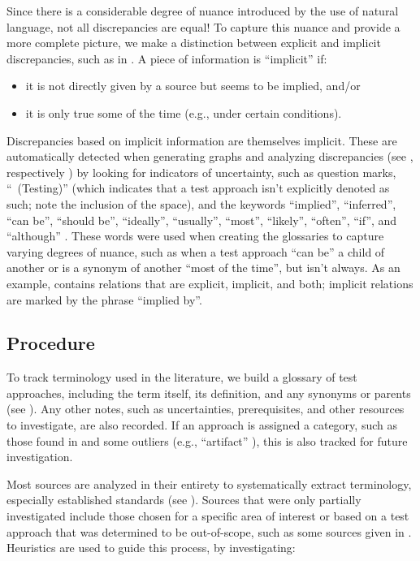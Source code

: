 Since there is a considerable degree of nuance introduced by the use of natural
language, not all discrepancies are equal! To capture this nuance and provide a
more complete picture, we make a distinction between explicit and implicit
discrepancies, such as in . A piece of
information is ``implicit'' if:
\begin{itemize}
    \item it is not directly given by a source but seems to be implied, and/or
    \item it is only true some of the time (e.g., under certain conditions).
\end{itemize}
Discrepancies based on implicit information are themselves implicit. These are
automatically detected when generating graphs and analyzing discrepancies
(see \ifnotpaper {}, respectively\else
    \fi) by looking for indicators
of uncertainty, such as question marks, ``~(Testing)'' (which indicates that a
test approach isn't explicitly denoted as such; note the inclusion of the
space), and the keywords ``implied'', ``inferred'', ``can be'', ``should be'',
``ideally'', ``usually'', ``most'', ``likely'', ``often'', ``if'', and ``although''
. These words were used when creating
the glossaries to capture varying degrees of nuance, such as when a test
approach ``can be'' a child of another or is a synonym of another ``most of the
time'', but isn't always. As an example,  contains relations
that are explicit, implicit, and both; implicit relations are marked by the
phrase ``implied by''.

\subsection{Procedure}

To track terminology used in the literature, we build a glossary of test
approaches, including the term itself, its definition, and
any synonyms or parents (see ). Any other notes, such as
uncertainties, prerequisites, and other resources to investigate, are also
recorded. If an approach is assigned a category, such as those found in
 and some outliers (e.g., ``artifact''%
), this is also tracked for future investigation.

Most sources are analyzed in their entirety to systematically extract
terminology, especially established standards (see ). Sources that
were only partially investigated include those chosen for a specific area of
interest or based on a test approach that was determined to be out-of-scope,
such as some sources given in .
Heuristics are used to guide this process, by investigating:

